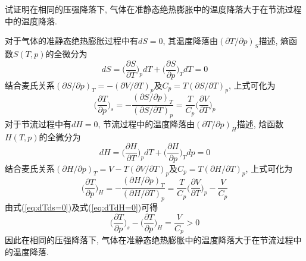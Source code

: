 \begin{problem}[2.6]
试证明在相同的压强降落下, 气体在准静态绝热膨胀中的温度降落大于在节流过程中的温度降落.
\end{problem}
\begin{solution}
对于气体的准静态绝热膨胀过程中有$dS=0$, 其温度降落由$(\partial T/\partial p)_S$描述, 熵函数$S(T,p)$的全微分为
\[
dS = \bigg(\frac{\partial S}{\partial T}\bigg)_p d T + \bigg(\frac{\partial S}{\partial p}\bigg)_T d T = 0
\]
结合麦氏关系$(\partial S/\partial p)_T=-(\partial V/\partial T)_p$及$C_p=T(\partial S/\partial T)_p$, 上式可化为
\begin{equation}\label{eq:dTds=0}
\bigg(\frac{\partial T}{\partial p}\bigg)_s = -\frac{(\partial S/\partial p)_T}{(\partial S/\partial T)_p} = \frac{T}{C_p}\bigg(\frac{\partial V}{\partial T}\bigg)_p
\end{equation}
对于节流过程中有$dH =0$, 节流过程中的温度降落由$(\partial T/\partial p)_H$描述, 焓函数$H(T,p)$的全微分为
\[
dH = \bigg(\frac{\partial H}{\partial T}\bigg)_p dT + \bigg(\frac{\partial H}{\partial p}\bigg)_T dp = 0
\]
结合麦氏关系$(\partial H/\partial p)_T=V-T(\partial V/\partial T)_p$及$C_p=T(\partial H/\partial T)_p$, 上式可化为
\begin{equation}\label{eq:dTdH=0}
\bigg(\frac{\partial T}{\partial p}\bigg)_H = -\frac{(\partial H/\partial p)_T}{(\partial H/\partial T)_p}
=\frac{T}{C_p} \bigg(\frac{\partial V}{\partial T}\bigg)_p-
\frac{V}{C_p}
\end{equation}
由式(\ref{eq:dTds=0})及式(\ref{eq:dTdH=0})可得
\[
\bigg(\frac{\partial T}{\partial p}\bigg)_s - \bigg(\frac{\partial T}{\partial p}\bigg)_H = \frac{V}{C_p} > 0
\]
因此在相同的压强降落下, 气体在准静态绝热膨胀中的温度降落大于在节流过程中的温度降落.
\end{solution}
